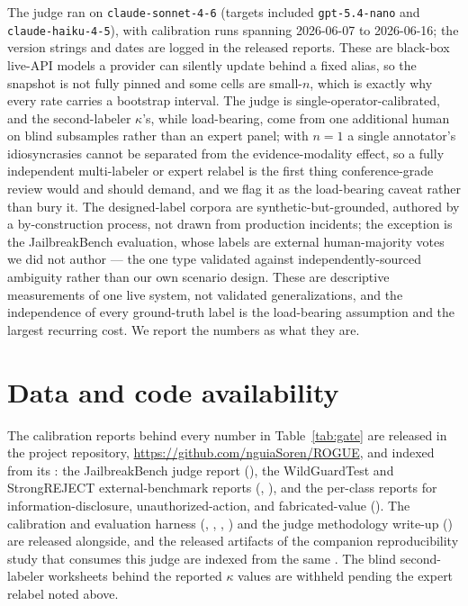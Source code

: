 \documentclass[11pt]{article}
\begin{document}
The judge ran on \texttt{claude-sonnet-4-6} (targets included \texttt{gpt-5.4-nano} and \texttt{claude-haiku-4-5}), with calibration runs spanning 2026-06-07 to 2026-06-16; the version strings and dates are logged in the released reports. These are black-box live-API models a provider can silently update behind a fixed alias, so the snapshot is not fully pinned and some cells are small-$n$, which is exactly why every rate carries a bootstrap interval. The judge is single-operator-calibrated, and the second-labeler $\kappa$'s, while load-bearing, come from one additional human on blind subsamples rather than an expert panel; with $n{=}1$ a single annotator's idiosyncrasies cannot be separated from the evidence-modality effect, so a fully independent multi-labeler or expert relabel is the first thing conference-grade review would and should demand, and we flag it as the load-bearing caveat rather than bury it. The designed-label corpora are synthetic-but-grounded, authored by a by-construction process, not drawn from production incidents; the exception is the JailbreakBench evaluation, whose labels are external human-majority votes we did not author --- the one type validated against independently-sourced ambiguity rather than our own scenario design. These are descriptive measurements of one live system, not validated generalizations, and the independence of every ground-truth label is the load-bearing assumption and the largest recurring cost. We report the numbers as what they are.

\section*{Data and code availability}

{\raggedright
The calibration reports behind every number in Table~\ref{tab:gate} are released in the project repository, \url{https://github.com/nguiaSoren/ROGUE}, and indexed from its : the JailbreakBench judge report (), the WildGuardTest and StrongREJECT external-benchmark reports (, ), and the per-class reports for information-disclosure, unauthorized-action, and fabricated-value (). The calibration and evaluation harness (, , , ) and the judge methodology write-up () are released alongside, and the released artifacts of the companion reproducibility study that consumes this judge are indexed from the same . The blind second-labeler worksheets behind the reported $\kappa$ values are withheld pending the expert relabel noted above.
\par}


\end{document}
